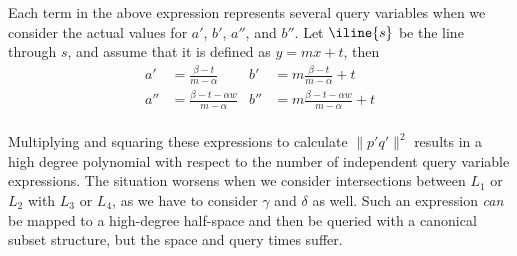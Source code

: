 Each term in the above expression represents several query variables when we consider the actual values for $a'$, $b'$, $a''$, and $b''$.  
Let $\iline{s}$ be the line through $s$, and assume that it is defined as $y = mx + t$, then
\begin{align*}
a'  &= \frac{\beta - t}{m - \alpha}
&b'  &= m \frac{\beta - t}{m - \alpha} + t \\
a'' &= \frac{\beta - t - \alpha w}{m - \alpha} 
&b'' &= m \frac{\beta - t - \alpha w}{m - \alpha} + t \\
\end{align*}

Multiplying and squaring these expressions to calculate $\|p'q'\|^2$ results in a high degree polynomial with respect to the number of independent query variable expressions.
The situation worsens when we consider intersections between $L_1$ or $L_2$ with $L_3$ or $L_4$, as we have to consider $\gamma$ and $\delta$ as well.
Such an expression \emph{can} be mapped to a high-degree half-space and then be queried with a canonical subset structure, but the space and query times suffer.

